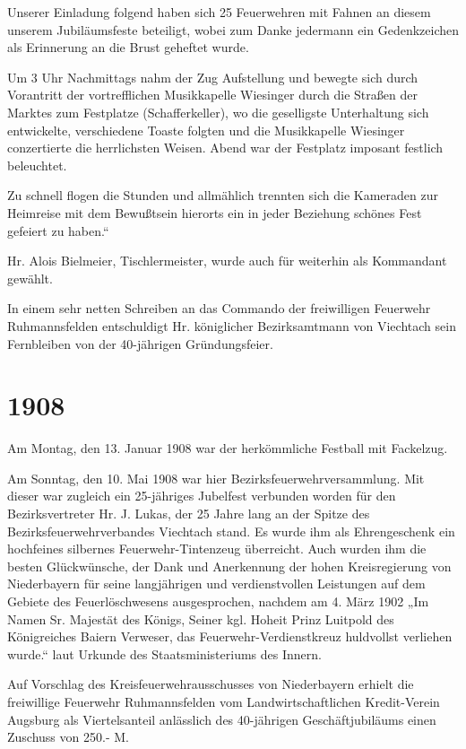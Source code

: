 \documentclass[12pt,a4paper]{book}
\begin{document}
Unserer Einladung folgend haben sich 25 Feuerwehren mit Fahnen an diesem unserem
Jubiläumsfeste beteiligt, wobei zum Danke jedermann ein Gedenkzeichen als
Erinnerung an die Brust geheftet wurde.

Um 3 Uhr Nachmittags nahm der Zug Aufstellung und bewegte sich durch Vorantritt
der vortrefflichen Musikkapelle Wiesinger durch die Straßen der Marktes zum
Festplatze (Schafferkeller), wo die geselligste Unterhaltung sich entwickelte,
verschiedene Toaste folgten und die Musikkapelle Wiesinger conzertierte die
herrlichsten Weisen. Abend war der Festplatz imposant festlich beleuchtet.

Zu schnell flogen die Stunden und allmählich trennten sich die Kameraden zur
Heimreise mit dem Bewußtsein hierorts ein in jeder Beziehung schönes Fest
gefeiert zu haben.“

Hr. Alois Bielmeier, Tischlermeister, wurde auch für weiterhin als Kommandant
gewählt.

In einem sehr netten Schreiben an das Commando der freiwilligen Feuerwehr
Ruhmannsfelden entschuldigt Hr. königlicher Bezirksamtmann von Viechtach sein
Fernbleiben von der 40-jährigen Gründungsfeier.

\section*{1908}

Am Montag, den 13. Januar 1908 war der herkömmliche Festball mit Fackelzug.

Am Sonntag, den 10. Mai 1908 war hier Bezirksfeuerwehrversammlung. Mit dieser
war zugleich ein 25-jähriges Jubelfest verbunden worden für den Bezirksvertreter
Hr. J. Lukas, der 25 Jahre lang an der Spitze des Bezirksfeuerwehrverbandes
Viechtach stand. Es wurde ihm als Ehrengeschenk ein hochfeines silbernes
Feuerwehr-Tintenzeug überreicht. Auch wurden ihm die besten Glückwünsche, der
Dank und Anerkennung der hohen Kreisregierung von Niederbayern für seine
langjährigen und verdienstvollen Leistungen auf dem Gebiete des Feuerlöschwesens
ausgesprochen, nachdem am 4. März 1902 „Im Namen Sr. Majestät des Königs, Seiner
kgl. Hoheit Prinz Luitpold des Königreiches Baiern Verweser, das
Feuerwehr-Verdienstkreuz huldvollst verliehen wurde.“ laut Urkunde des
Staatsministeriums des Innern.

Auf Vorschlag des Kreisfeuerwehrausschusses von Niederbayern erhielt die
freiwillige Feuerwehr Ruhmannsfelden vom Landwirtschaftlichen Kredit-Verein
Augsburg als Viertelsanteil anlässlich des 40-jährigen Geschäftjubiläums einen
Zuschuss von 250.- M.
\end{document}
